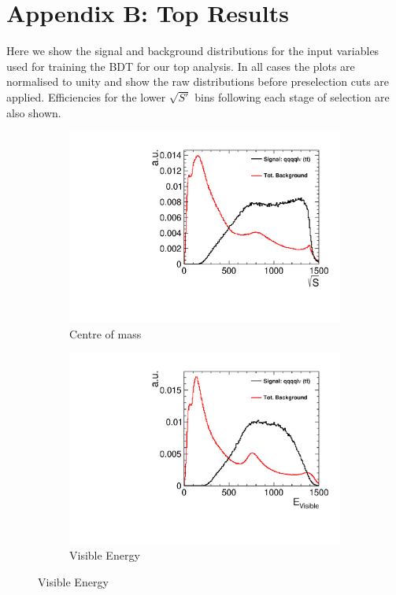 \chapter{Appendix B: Top Results}
\label{appendixB}

Here we show the signal and background distributions for the input variables used for training the BDT for our top analysis. In all cases the plots are normalised to unity and show the raw distributions before preselection cuts are applied. Efficiencies for the lower $\sqrt{S'}$ bins following each stage of selection are also shown. 


\begin{figure}[b] 
  \begin{subfigure}[b]{0.5\linewidth}
    \centering
    \includegraphics[width=0.75\linewidth]{TopAnalysis/figures/BDTVariables/EnergyConstraintAlt} 
    \caption{Centre of mass} 
    \vspace{4ex}
  \end{subfigure}%
  \begin{subfigure}[b]{0.5\linewidth}
    \centering
    \includegraphics[width=0.75\linewidth]{TopAnalysis/figures/BDTVariables/VisibleEnergy} 
    \caption{Visible Energy} 
    \vspace{4ex}
  \end{subfigure} 
\end{figure}

